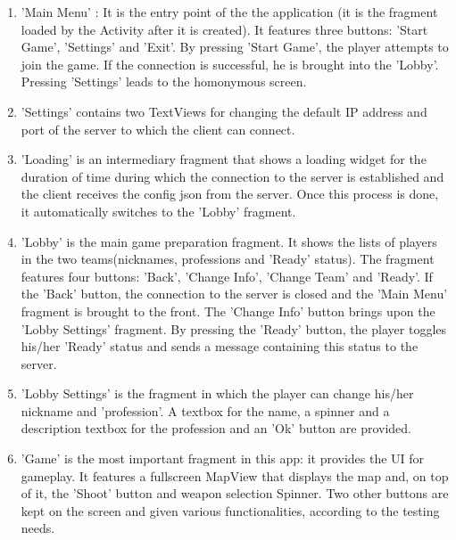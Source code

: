 \documentclass{article}
\begin{document}
\begin{enumerate}
  \item 'Main Menu' : It is the entry point of the the application (it is the
  fragment loaded by the Activity after it is created). It features three
  buttons: 'Start Game', 'Settings' and 'Exit'. By pressing 'Start Game', the
  player attempts to join the game. If the connection is successful, he is
  brought into the 'Lobby'. Pressing 'Settings' leads to the homonymous
  screen.
  
  \item 'Settings' contains two TextViews for changing the default IP
  address and port of the server to which the client can connect.
  
  \item 'Loading' is an intermediary fragment that shows a loading widget for
  the duration of time during which the connection to the server is established
  and the client receives the config json from the server. Once this process is
  done, it automatically switches to the 'Lobby' fragment.
  
  \item 'Lobby' is the main game preparation fragment. It shows the lists of
  players in the two teams(nicknames, professions and 'Ready' status). The
  fragment features four buttons: 'Back', 'Change Info', 'Change Team' and
  'Ready'. If the 'Back' button, the connection to the server is closed and the
  'Main Menu' fragment is brought to the front. The 'Change Info' button brings
  upon the 'Lobby Settings' fragment. By pressing the 'Ready' button, the player
  toggles his/her 'Ready' status and sends a message containing this status to
  the server.
  
  \item 'Lobby Settings' is the fragment in which the player can change his/her
  nickname and 'profession'. A textbox for the name, a spinner and a
  description textbox for the profession and an 'Ok' button are provided. 
  
  \item 'Game' is the most important fragment in this app: it provides the UI
  for gameplay. It features a fullscreen MapView that displays the map and, on
  top of it, the 'Shoot' button and weapon selection Spinner. Two other buttons
  are kept on the screen and given various functionalities, according to the
  testing needs.
   
\end{enumerate}
\end{document}
